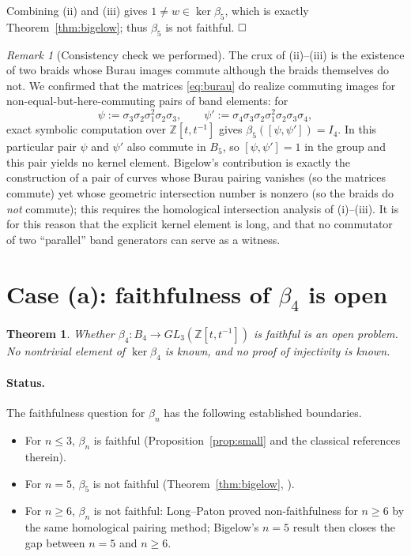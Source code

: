\documentclass{amsart}
\newtheorem{theorem}{Theorem}
\theoremstyle{remark}
\newtheorem{remark}{Remark}
\begin{document}
Combining (ii) and (iii) gives $1\ne w\in\ker\beta_5$, which is exactly
Theorem~\ref{thm:bigelow}; thus $\beta_5$ is not faithful. $\hfill\square$

\begin{remark}[Consistency check we performed]
The crux of (ii)--(iii) is the existence of two braids whose Burau images
commute although the braids themselves do not. We confirmed that the matrices
\eqref{eq:burau} do realize commuting images for non-equal-but-here-commuting
pairs of band elements: for
\[
\psi:=\sigma_3\sigma_2\sigma_1^{2}\sigma_2\sigma_3,\qquad
\psi':=\sigma_4\sigma_3\sigma_2\sigma_1^{2}\sigma_2\sigma_3\sigma_4,
\]
exact symbolic computation over $\mathbb Z[t,t^{-1}]$ gives
$\beta_5([\psi,\psi'])=I_4$. In this particular pair $\psi$ and $\psi'$ also
commute in $B_5$, so $[\psi,\psi']=1$ in the group and this pair yields no
kernel element. Bigelow's contribution is exactly the construction of a pair of
curves whose Burau pairing vanishes (so the matrices commute) yet whose
geometric intersection number is nonzero (so the braids do \emph{not} commute);
this requires the homological intersection analysis of (i)--(iii). It is for
this reason that the explicit kernel element is long, and that no commutator of
two ``parallel'' band generators can serve as a witness.
\end{remark}

\section{Case (a): faithfulness of $\beta_4$ is open}

\begin{theorem}\label{thm:open}
Whether $\beta_4:B_4\to GL_3(\mathbb Z[t,t^{-1}])$ is faithful is an open
problem. No nontrivial element of $\ker\beta_4$ is known, and no proof of
injectivity is known.
\end{theorem}

\paragraph{Status.}
The faithfulness question for $\beta_n$ has the following established
boundaries.
\begin{itemize}
\item For $n\le 3$, $\beta_n$ is faithful (Proposition~\ref{prop:small} and the
classical references therein).
\item For $n=5$, $\beta_5$ is not faithful (Theorem~\ref{thm:bigelow},
\cite{Bigelow1999}).
\item For $n\ge 6$, $\beta_n$ is not faithful: Long--Paton \cite{LongPaton}
proved non-faithfulness for $n\ge 6$ by the same homological pairing method;
Bigelow's $n=5$ result then closes the gap between $n=5$ and $n\ge6$.
\end{itemize}
\end{document}
